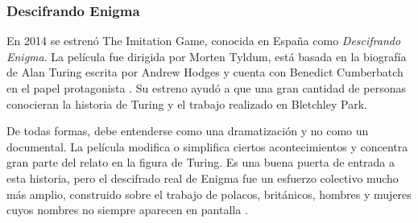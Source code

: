 \subsubsection {Descifrando Enigma}

En 2014 se estrenó The Imitation Game, conocida en España como \textit{Descifrando Enigma}. La película fue dirigida por Morten Tyldum, está basada en la biografía de Alan Turing escrita por Andrew Hodges y cuenta con Benedict Cumberbatch en el papel protagonista \cite{devel_turing_enigma}. Su estreno ayudó a que una gran cantidad de personas conocieran la historia de Turing y el trabajo realizado en Bletchley Park.


De todas formas, debe entenderse como una dramatización y no como un documental. La película modifica o simplifica ciertos acontecimientos y concentra gran parte del relato en la figura de Turing. Es una buena puerta de entrada a esta historia, pero el descifrado real de Enigma fue un esfuerzo colectivo mucho más amplio, construido sobre el trabajo de polacos, británicos, hombres y mujeres cuyos nombres no siempre aparecen en pantalla \cite{devel_turing_enigma}.






